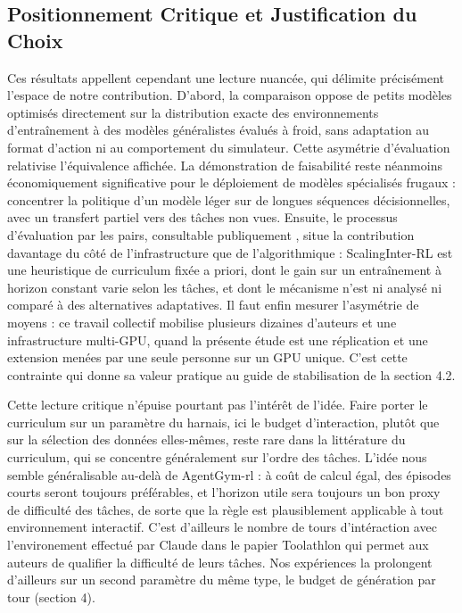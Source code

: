 \documentclass[11pt,a4paper]{article}
\begin{document}
\subsection{Positionnement Critique et Justification du Choix}

Ces résultats appellent cependant une lecture nuancée, qui délimite précisément l'espace de notre contribution. D'abord, la comparaison oppose de petits modèles optimisés directement sur la distribution exacte des environnements d'entraînement à des modèles généralistes évalués à froid, sans adaptation au format d'action ni au comportement du simulateur. Cette asymétrie d'évaluation relativise l'équivalence affichée. La démonstration de faisabilité reste néanmoins économiquement significative pour le déploiement de modèles spécialisés frugaux : concentrer la politique d'un modèle léger sur de longues séquences décisionnelles, avec un transfert partiel vers des tâches non vues. Ensuite, le processus d'évaluation par les pairs, consultable publiquement \cite{xi_agentgymrl_openreview}, situe la contribution davantage du côté de l'infrastructure que de l'algorithmique : ScalingInter-RL est une heuristique de curriculum fixée a priori, dont le gain sur un entraînement à horizon constant varie selon les tâches, et dont le mécanisme n'est ni analysé ni comparé à des alternatives adaptatives. Il faut enfin mesurer l'asymétrie de moyens : ce travail collectif mobilise plusieurs dizaines d'auteurs et une infrastructure multi-GPU, quand la présente étude est une réplication et une extension menées par une seule personne sur un GPU unique. C'est cette contrainte qui donne sa valeur pratique au guide de stabilisation de la section 4.2.

Cette lecture critique n'épuise pourtant pas l'intérêt de l'idée. Faire porter le curriculum sur un paramètre du harnais, ici le budget d'interaction, plutôt que sur la sélection des données elles-mêmes, reste rare dans la littérature du curriculum, qui se concentre généralement sur l'ordre des tâches. L'idée nous semble généralisable au-delà de AgentGym-rl : à coût de calcul égal, des épisodes courts seront toujours préférables, et l'horizon utile sera toujours un bon proxy de difficulté des tâches, de sorte que la règle est plausiblement applicable à tout environnement interactif. C'est d'ailleurs le nombre de tours d'intéraction avec l'environement effectué par Claude dans le papier Toolathlon qui permet aux auteurs de qualifier la difficulté de leurs tâches. Nos expériences la prolongent d'ailleurs sur un second paramètre du même type, le budget de génération par tour (section 4).
\end{document}
